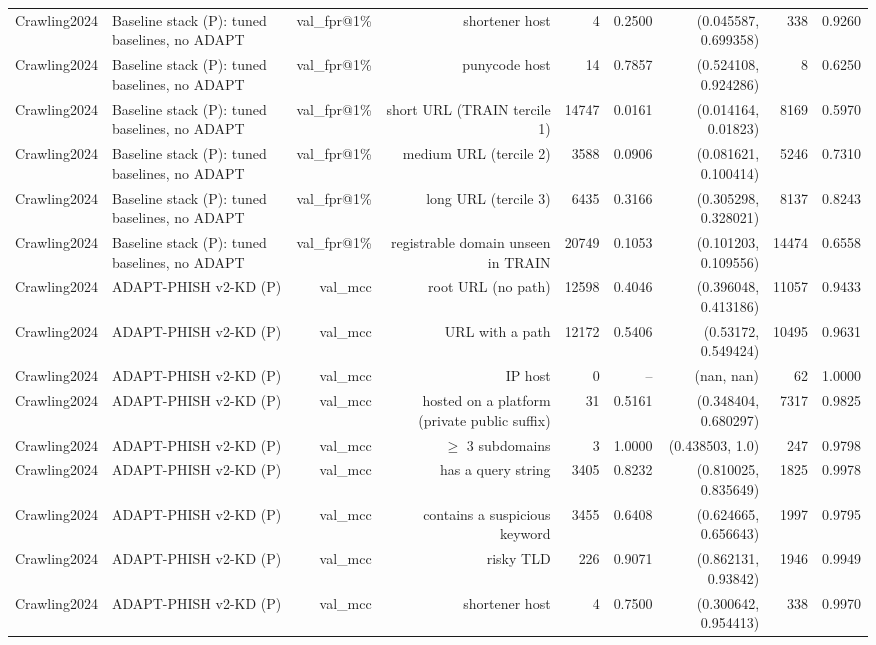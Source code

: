 \begin{table}[t]
\begin{tabular}{llrrrrrrr}
Crawling2024 & Baseline stack (P): tuned baselines, no ADAPT & val\_fpr@1\% & shortener host & 4 & 0.2500 & (0.045587, 0.699358) & 338 & 0.9260 \\
Crawling2024 & Baseline stack (P): tuned baselines, no ADAPT & val\_fpr@1\% & punycode host & 14 & 0.7857 & (0.524108, 0.924286) & 8 & 0.6250 \\
Crawling2024 & Baseline stack (P): tuned baselines, no ADAPT & val\_fpr@1\% & short URL (TRAIN tercile 1) & 14747 & 0.0161 & (0.014164, 0.01823) & 8169 & 0.5970 \\
Crawling2024 & Baseline stack (P): tuned baselines, no ADAPT & val\_fpr@1\% & medium URL (tercile 2) & 3588 & 0.0906 & (0.081621, 0.100414) & 5246 & 0.7310 \\
Crawling2024 & Baseline stack (P): tuned baselines, no ADAPT & val\_fpr@1\% & long URL (tercile 3) & 6435 & 0.3166 & (0.305298, 0.328021) & 8137 & 0.8243 \\
Crawling2024 & Baseline stack (P): tuned baselines, no ADAPT & val\_fpr@1\% & registrable domain unseen in TRAIN & 20749 & 0.1053 & (0.101203, 0.109556) & 14474 & 0.6558 \\
Crawling2024 & ADAPT-PHISH v2-KD (P) & val\_mcc & root URL (no path) & 12598 & 0.4046 & (0.396048, 0.413186) & 11057 & 0.9433 \\
Crawling2024 & ADAPT-PHISH v2-KD (P) & val\_mcc & URL with a path & 12172 & 0.5406 & (0.53172, 0.549424) & 10495 & 0.9631 \\
Crawling2024 & ADAPT-PHISH v2-KD (P) & val\_mcc & IP host & 0 & -- & (nan, nan) & 62 & 1.0000 \\
Crawling2024 & ADAPT-PHISH v2-KD (P) & val\_mcc & hosted on a platform (private public suffix) & 31 & 0.5161 & (0.348404, 0.680297) & 7317 & 0.9825 \\
Crawling2024 & ADAPT-PHISH v2-KD (P) & val\_mcc & $\geq$ 3 subdomains & 3 & 1.0000 & (0.438503, 1.0) & 247 & 0.9798 \\
Crawling2024 & ADAPT-PHISH v2-KD (P) & val\_mcc & has a query string & 3405 & 0.8232 & (0.810025, 0.835649) & 1825 & 0.9978 \\
Crawling2024 & ADAPT-PHISH v2-KD (P) & val\_mcc & contains a suspicious keyword & 3455 & 0.6408 & (0.624665, 0.656643) & 1997 & 0.9795 \\
Crawling2024 & ADAPT-PHISH v2-KD (P) & val\_mcc & risky TLD & 226 & 0.9071 & (0.862131, 0.93842) & 1946 & 0.9949 \\
Crawling2024 & ADAPT-PHISH v2-KD (P) & val\_mcc & shortener host & 4 & 0.7500 & (0.300642, 0.954413) & 338 & 0.9970 \\

\end{tabular}
\end{table}
